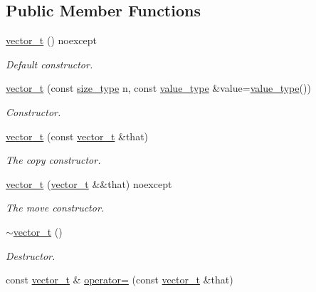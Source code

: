 \subsection*{Public Member Functions}
\begin{DoxyCompactItemize}
\item 
\mbox{\label{classatom_1_1vector__t_a72425f7c04f5d5fffd5244596c9a33c0}} 
\hyperlink{classatom_1_1vector__t_a72425f7c04f5d5fffd5244596c9a33c0}{vector\+\_\+t} () noexcept
\begin{DoxyCompactList}\small\item\em Default constructor. \end{DoxyCompactList}\item 
\hyperlink{classatom_1_1vector__t_a6c045495ebfcd53b4d91d9c76ceb5fdf}{vector\+\_\+t} (const \hyperlink{classatom_1_1vector__t_a1790d79321f4fa8d2580474dd0f56033}{size\+\_\+type} n, const \hyperlink{classatom_1_1vector__t_a558283a4fed53856d445ceb61ac96d94}{value\+\_\+type} \&value=\hyperlink{classatom_1_1vector__t_a558283a4fed53856d445ceb61ac96d94}{value\+\_\+type}())
\begin{DoxyCompactList}\small\item\em Constructor. \end{DoxyCompactList}\item 
\hyperlink{classatom_1_1vector__t_a2c546a0310265fa1eabcc21ac4349d33}{vector\+\_\+t} (const \hyperlink{classatom_1_1vector__t}{vector\+\_\+t} \&that)
\begin{DoxyCompactList}\small\item\em The copy constructor. \end{DoxyCompactList}\item 
\hyperlink{classatom_1_1vector__t_a7fb03f8164c86f7e9df312fe4da33fd0}{vector\+\_\+t} (\hyperlink{classatom_1_1vector__t}{vector\+\_\+t} \&\&that) noexcept
\begin{DoxyCompactList}\small\item\em The move constructor. \end{DoxyCompactList}\item 
\hyperlink{classatom_1_1vector__t_afa9985af7e737691bfd4fc2c876c3378}{$\sim$vector\+\_\+t} ()
\begin{DoxyCompactList}\small\item\em Destructor. \end{DoxyCompactList}\item 
const \hyperlink{classatom_1_1vector__t}{vector\+\_\+t} \& \hyperlink{classatom_1_1vector__t_af0b2037e8034d5bb97ac320f4513df2d}{operator=} (const \hyperlink{classatom_1_1vector__t}{vector\+\_\+t} \&that)

\end{DoxyCompactItemize}
